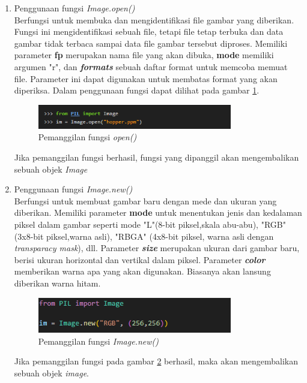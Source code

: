 \begin{enumerate}
	\item Penggunaan fungsi \textit{Image.open()}\\
	Berfungsi untuk membuka dan mengidentifikasi file gambar yang diberikan. Fungsi ini mengidentifikasi sebuah file, tetapi file tetap terbuka dan data gambar tidak terbaca sampai data file gambar tersebut diproses. Memiliki parameter \textbf{fp} merupakan nama file yang akan dibuka, \textbf{mode} memiliki argumen "r", dan \textit{\textbf{formats}} sebuah daftar format untuk memcoba memuat file. Parameter ini dapat digunakan untuk membatas format yang akan diperiksa. Dalam penggunaan fungsi dapat dilihat pada gambar \ref{fig:openimage}.
	\begin{figure}[H]
		\centering
		\includegraphics[width=0.8\textwidth]{Gambar/imageclass.png}
		\caption{Pemanggilan fungsi \textit{open()}}
		\label{fig:openimage}
	\end{figure}
	Jika pemanggilan fungsi berhasil, fungsi yang dipanggil akan mengembalikan sebuah objek \textit{Image}
	\item Penggunaan fungsi \textit{Image.new()}\\
	Berfungsi untuk membuat gambar baru dengan mede dan ukuran yang diberikan. Memiliki parameter \textbf{mode} untuk menentukan jenis dan kedalaman piksel dalam gambar seperti mode "L"(8-bit piksel,skala abu-abu), "RGB" (3x8-bit piksel,warna asli), "RBGA" (4x8-bit piksel, warna asli dengan \textit{transparacy mask}), dll. Parameter \textit{\textbf{size}} merupakan ukuran dari gambar baru, berisi ukuran horizontal dan vertikal dalam piksel. Parameter \textit{\textbf{color}} memberikan warna apa yang akan digunakan. Biasanya akan lansung diberikan warna hitam.
	\begin{figure}[H]
		\centering
		\includegraphics[width=0.8\textwidth]{Gambar/imagenew.png}
		\caption{Pemanggilan fungsi \textit{Image.new()}}
		\label{fig:imagenew}
	\end{figure}
	Jika pemanggilan fungsi pada gambar \ref{fig:imagenew} berhasil, maka akan mengembalikan sebuah objek \textit{image}.

\end{enumerate}
